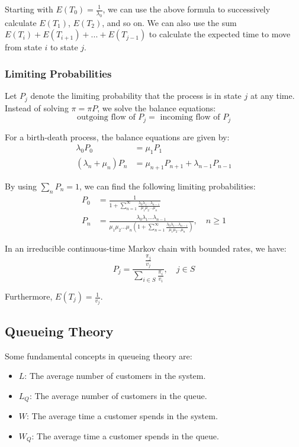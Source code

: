 \documentclass[12pt]{article}
\begin{document}
\noindent
Starting with $E(T_0) = \frac{1}{\lambda_0}$, we can use the above formula to successively calculate $E(T_1)$, $E(T_2)$, and so on.
We can also use the sum $E(T_i) + E(T_{i + 1}) + ... + E(T_{j - 1})$ to calculate the expected time to move from state $i$ to state $j$.

\subsubsection{Limiting Probabilities}
Let $P_j$ denote the limiting probability that the process is in state $j$ at any time.
Instead of solving $\pi = \pi P$, we solve the balance equations:
\[ \text{outgoing flow of } P_j = \text{ incoming flow of } P_j \]

\noindent
For a birth-death process, the balance equations are given by:
\begin{align*}
    \lambda_0 P_0 &= \mu_1 P_1 \\
    (\lambda_n + \mu_n) P_n &= \mu_{n + 1}P_{n + 1} + \lambda_{n - 1}P_{n - 1}
\end{align*}

\noindent
By using $\displaystyle \sum_n P_n = 1$, we can find the following limiting probabilities:
\begin{align*}
    P_0 &= \frac{1}{\displaystyle 1 + \sum_{n = 1}^\infty \frac{\lambda_0 \lambda_1 \dots \lambda_{n - 1}}{\mu_1 \mu_2 \dots \mu_n}} \\
    P_n &= \frac{\lambda_0 \lambda_1 \dots \lambda_{n - 1}}{\displaystyle \mu_1 \mu_2 \dots \mu_n \left( 1 + \sum_{n = 1}^\infty \frac{\lambda_0 \lambda_1 \dots \lambda_{n - 1}}{\mu_1 \mu_2 \dots \mu_n} \right)}, \quad n \geq 1
\end{align*}

\noindent
In an irreducible continuous-time Markov chain with bounded rates, we have:
\[ P_j = \frac{\displaystyle \frac{\pi_j}{v_j}}{\displaystyle \sum_{i \in S} \frac{\pi_i}{v_i}}, \quad j \in S \]

\noindent
Furthermore, $\displaystyle E(T_j) = \frac{1}{v_j}$.

\newpage
\subsection{Queueing Theory}
Some fundamental concepts in queueing theory are:

\begin{itemize}
    \item $L$: The average number of customers in the system.
    \item $L_Q$: The average number of customers in the queue.
    \item $W$: The average time a customer spends in the system.
    \item $W_Q$: The average time a customer spends in the queue.
\end{itemize}
\end{document}
